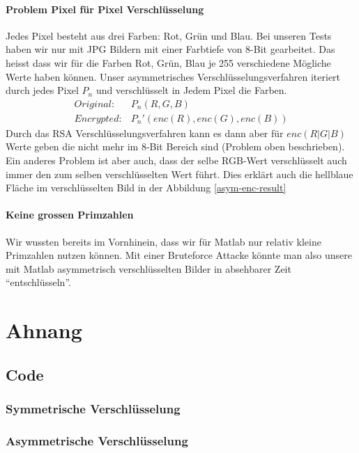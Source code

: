 \documentclass[paper=a4,fontsize=12pt]{scrartcl}
\begin{document}
\paragraph{Problem Pixel für Pixel Verschlüsselung} 
Jedes Pixel besteht aus drei Farben: Rot, Grün und Blau.
Bei unseren Tests haben wir nur mit JPG Bildern mit einer Farbtiefe von 8-Bit gearbeitet.
Das heisst dass wir für die Farben Rot, Grün, Blau je 255 verschiedene Mögliche Werte haben können.
Unser asymmetrisches Verschlüsselungsverfahren iteriert durch jedes Pixel $P_n$ und verschlüsselt
in Jedem Pixel die Farben.
\begin{align} 
Original: &P_n(R,G,B) \\
Encrypted: &P_n'(enc(R), enc(G), enc(B))
\end{align}
Durch das RSA Verschlüsselungsverfahren kann es dann aber für $enc(R|G|B)$ Werte geben die nicht mehr
im 8-Bit Bereich sind (Problem oben beschrieben).
Ein anderes Problem ist aber auch, dass der selbe RGB-Wert verschlüsselt auch immer den zum selben
verschlüsselten Wert führt. Dies erklärt auch die hellblaue Fläche im verschlüsselten Bild 
in der Abbildung \ref{asym-enc-result}

\paragraph{Keine grossen Primzahlen}
Wir wussten bereits im Vornhinein, dass wir für Matlab nur relativ kleine Primzahlen nutzen können.
Mit einer Bruteforce Attacke könnte man also unsere mit Matlab asymmetrisch verschlüsselten Bilder
in absehbarer Zeit "`entschlüsseln"'.
 
 
\newpage
\section{Ahnang}
\subsection{Code}
\subsubsection{Symmetrische Verschlüsselung}



\newpage
\subsubsection{Asymmetrische Verschlüsselung}


\end{document}
